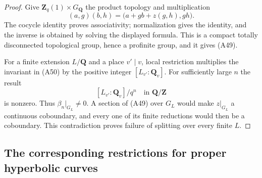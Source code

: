 \begin{proof}
Give $\mathbf Z_q(1)\times G_{\mathbf Q}$ the
product topology and multiplication
\[
 (a,g)(b,h)=\bigl(a+g b+z(g,h),gh\bigr).
                                                        \tag{A51}
\]
The cocycle identity proves associativity;
normalization gives the identity, and the
inverse is obtained by solving the displayed
formula. This is a compact totally disconnected
topological group, hence a profinite group,
and it gives (A49).

For a finite extension $L/\mathbf Q$ and a
place $v'\mid v$, local restriction multiplies
the invariant in (A50) by the positive integer
$[L_{v'}:\mathbf Q_v]$. For sufficiently large
$n$ the result
\[
                 [L_{v'}:\mathbf Q_v]/q^n
                         \quad\text{in }\mathbf Q/\mathbf Z
\]
is nonzero. Thus $\beta_n|_{G_L}\ne0$.
A section of (A49) over $G_L$ would make
$z|_{G_L}$ a continuous coboundary, and every
one of its finite reductions would then be
a coboundary. This contradiction proves
failure of splitting over every finite $L$.
\end{proof}

\subsection{The corresponding restrictions for proper hyperbolic curves}

